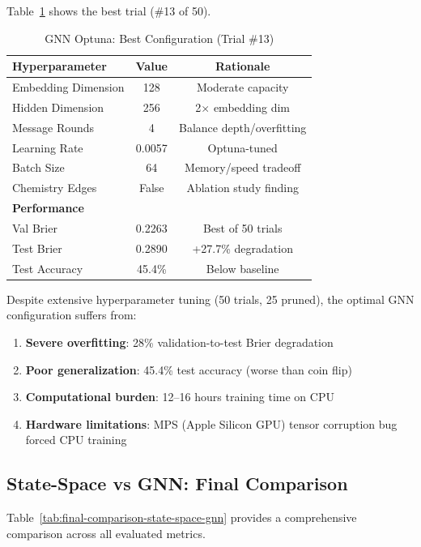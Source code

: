 Table~\ref{tab:gnn-optuna-best} shows the best trial (\#13 of 50).

\begin{table}[h]
\centering
\caption{GNN Optuna: Best Configuration (Trial \#13)}
\label{tab:gnn-optuna-best}
\begin{tabular}{lcc}
\toprule
\textbf{Hyperparameter} & \textbf{Value} & \textbf{Rationale} \\
\midrule
Embedding Dimension & 128 & Moderate capacity \\
Hidden Dimension & 256 & 2$\times$ embedding dim \\
Message Rounds & 4 & Balance depth/overfitting \\
Learning Rate & 0.0057 & Optuna-tuned \\
Batch Size & 64 & Memory/speed tradeoff \\
Chemistry Edges & False & Ablation study finding \\
\midrule
\multicolumn{3}{l}{\textbf{Performance}} \\
Val Brier & 0.2263 & Best of 50 trials \\
Test Brier & 0.2890 & +27.7\% degradation \\
Test Accuracy & 45.4\% & Below baseline \\
\bottomrule
\end{tabular}
\end{table}

Despite extensive hyperparameter tuning (50 trials, 25 pruned), the optimal GNN configuration suffers from:

\begin{enumerate}
    \item \textbf{Severe overfitting}: 28\% validation-to-test Brier degradation
    \item \textbf{Poor generalization}: 45.4\% test accuracy (worse than coin flip)
    \item \textbf{Computational burden}: 12--16 hours training time on CPU
    \item \textbf{Hardware limitations}: MPS (Apple Silicon GPU) tensor corruption bug forced CPU training
\end{enumerate}

\subsection{State-Space vs GNN: Final Comparison}

Table~\ref{tab:final-comparison-state-space-gnn} provides a comprehensive comparison across all evaluated metrics.

